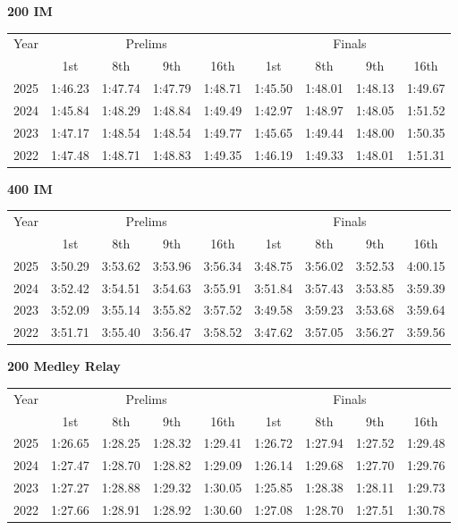 \textbf{200 IM}

\begin{flushleft}
\begin{tabular}{|c|c|c|c|c|c|c|c|c|}
\hline
Year & \multicolumn{4}{c|}{Prelims} & \multicolumn{4}{c|}{Finals} \\
\cline{2-9}
& 1st & 8th & 9th & 16th & 1st & 8th & 9th & 16th \\
\hline
2025 & 1:46.23 & 1:47.74 & 1:47.79 & 1:48.71 & 1:45.50 & 1:48.01 & 1:48.13 & 1:49.67 \\
2024 & 1:45.84 & 1:48.29 & 1:48.84 & 1:49.49 & 1:42.97 & 1:48.97 & 1:48.05 & 1:51.52 \\
2023 & 1:47.17 & 1:48.54 & 1:48.54 & 1:49.77 & 1:45.65 & 1:49.44 & 1:48.00 & 1:50.35 \\
2022 & 1:47.48 & 1:48.71 & 1:48.83 & 1:49.35 & 1:46.19 & 1:49.33 & 1:48.01 & 1:51.31 \\
\hline
\end{tabular}
\end{flushleft}

\textbf{400 IM}

\begin{flushleft}
\begin{tabular}{|c|c|c|c|c|c|c|c|c|}
\hline
Year & \multicolumn{4}{c|}{Prelims} & \multicolumn{4}{c|}{Finals} \\
\cline{2-9}
& 1st & 8th & 9th & 16th & 1st & 8th & 9th & 16th \\
\hline
2025 & 3:50.29 & 3:53.62 & 3:53.96 & 3:56.34 & 3:48.75 & 3:56.02 & 3:52.53 & 4:00.15 \\
2024 & 3:52.42 & 3:54.51 & 3:54.63 & 3:55.91 & 3:51.84 & 3:57.43 & 3:53.85 & 3:59.39 \\
2023 & 3:52.09 & 3:55.14 & 3:55.82 & 3:57.52 & 3:49.58 & 3:59.23 & 3:53.68 & 3:59.64 \\
2022 & 3:51.71 & 3:55.40 & 3:56.47 & 3:58.52 & 3:47.62 & 3:57.05 & 3:56.27 & 3:59.56 \\
\hline
\end{tabular}
\end{flushleft}

\textbf{200 Medley Relay}

\begin{flushleft}
\begin{tabular}{|c|c|c|c|c|c|c|c|c|}
\hline
Year & \multicolumn{4}{c|}{Prelims} & \multicolumn{4}{c|}{Finals} \\
\cline{2-9}
& 1st & 8th & 9th & 16th & 1st & 8th & 9th & 16th \\
\hline
2025 & 1:26.65 & 1:28.25 & 1:28.32 & 1:29.41 & 1:26.72 & 1:27.94 & 1:27.52 & 1:29.48 \\
2024 & 1:27.47 & 1:28.70 & 1:28.82 & 1:29.09 & 1:26.14 & 1:29.68 & 1:27.70 & 1:29.76 \\
2023 &  1:27.27 & 1:28.88 & 1:29.32 & 1:30.05 & 1:25.85 & 1:28.38 & 1:28.11 & 1:29.73 \\
2022 & 1:27.66 & 1:28.91 & 1:28.92 & 1:30.60 & 1:27.08 & 1:28.70 & 1:27.51 & 1:30.78 \\
\hline
\end{tabular}
\end{flushleft}

